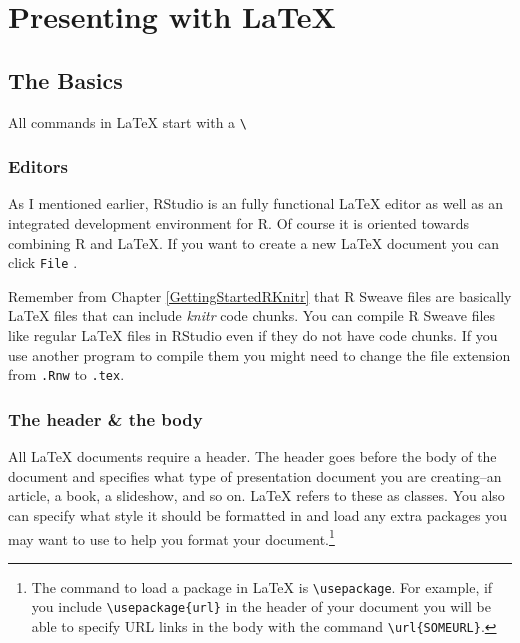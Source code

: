 



\chapter{Presenting with LaTeX}\label{LatexChapter}

\section{The Basics}

All commands in LaTeX start with a \texttt{\textbackslash{}}

\subsection{Editors}

As I mentioned earlier, RStudio is an fully functional LaTeX editor as well as an integrated development environment for R. Of course it is oriented towards combining R and LaTeX. If you want to create a new LaTeX document you can click {\tt{File}}  . 

Remember from Chapter \ref{GettingStartedRKnitr} that R Sweave files are basically LaTeX files that can include {\emph{knitr}} code chunks. You can compile R Sweave files like regular LaTeX files in RStudio even if they do not have code chunks. If you use another program to compile them you might need to change the file extension from {\tt{.Rnw}} to {\tt{.tex}}.

\subsection{The header \& the body}

All LaTeX documents require a header. The header goes before the body of the document and specifies what type of presentation document you are creating--an article, a book, a slideshow, and so on. LaTeX refers to these as classes. You also can specify what style it should be formatted in and load any extra packages you may want to use to help you format your document.\footnote{The command to load a package in LaTeX is \texttt{\textbackslash{}usepackage}. For example, if you include \texttt{\textbackslash{}usepackage\{url\}} in the header of your document you will be able to specify URL links in the body with the command \texttt{\textbackslash{}url\{SOMEURL\}}.}

